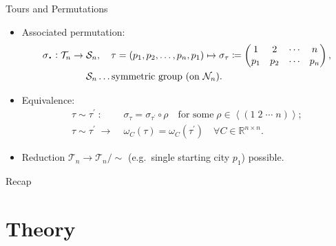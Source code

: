 \documentclass[
  size=8pt,
  style=klope,
  paper=screen,
  mode=present,
  nohandoutpagebreaks,
  pauseslide,
  hlsections,
  fleqn,
]{powerdot}
\newcommand*{\Cdot}{\raisebox{-0.30ex}{\scalebox{1.5}{$\cdot$}}}
\def\eqitspace{\vspace{-5mm}}
\begin{document}
\begin{slide}{Tours and Permutations}
\begin{itemize}
  \item
  Associated permutation:
  \begin{align}
  \begin{split}
    \sigma_{\Cdot} :
    \mathcal{T}_n \to \; & \mathcal{S}_n, \quad
    \tau = \left(p_1, p_2, \ldots, p_n, p_1 \right)
    \mapsto
  \sigma_\tau \coloneqq
  \begin{pmatrix}
    1 & 2 & \cdots & n \\
    p_1 & p_2 & \cdots &  p_n
  \end{pmatrix},
  \\
  & \mathcal{S}_n \ldots \text{symmetric group (on }\mathcal{N}_n \text{)}.
  \end{split}
  \end{align}
\eqitspace%
\item
  Equivalence:
  \begin{align}
    \tau \sim \tau^\prime
    \;:\;
    &
    \sigma_\tau = \sigma_{\tau^\prime} \circ \rho
    \quad \text{for some}\; \rho \in \left<\left(1 \; 2 \; \cdots \; n \right)\right>;
    \\
    \tau \sim \tau^\prime
    \;\rightarrow\;
    &
    \omega_C\left(\tau\right) = \omega_C\left(\tau^\prime\right)
    \quad \forall C \in \mathbb{R}^{n \times n}.
  \end{align}
  \eqitspace%
  \item
  Reduction $\mathcal{T}_n \to \mathcal{T}_n/{\sim}$ (e.g.\ single starting city $p_1$) possible.
\end{itemize}
\end{slide}

\begin{slide}[toc=,bm=]{Recap}
\tableofcontents[content=currentsection,type=1]
\end{slide}

\section[template=wideslide]{Theory}
\end{document}

